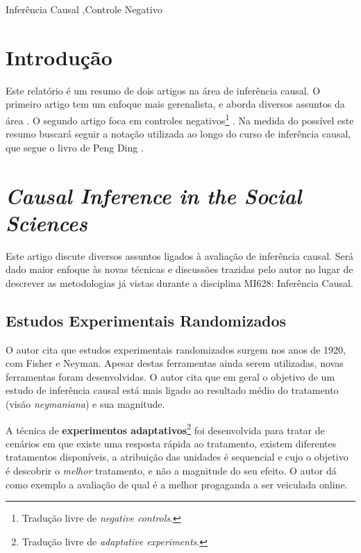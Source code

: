 \documentclass[final,5p]{elsarticle}
\numberwithin{equation}{section}
\begin{document}
\begin{frontmatter}
\begin{keyword}
    Inferência Causal \sep Controle Negativo



\end{keyword}

\end{frontmatter}

\section{Introdução}

    Este relatório é um resumo de dois artigos na área de inferência causal. O primeiro artigo tem um enfoque mais gerenalista, e aborda diversos assuntos da área \cite{imbens2024causal}. O segundo artigo foca em controles negativos\footnote{Tradução livre de \emph{negative controls}.} \cite{lipsitch2010negative}. Na medida do possível este resumo buscará seguir a notação utilizada ao longo do curso de inferência causal, que segue o livro de Peng Ding \cite{ding2023first}.

\section{\textit{Causal Inference in the Social Sciences}}

    Este artigo discute diversos assuntos ligados à avaliação de inferência causal. Será dado maior enfoque às novas técnicas e discussões trazidas pelo autor no lugar de descrever as metodologias já vistas durante a disciplina MI628: Inferência Causal.

    \subsection{Estudos Experimentais Randomizados}

    O autor cita que estudos experimentais randomizados surgem nos anos de 1920, com Fisher e Neyman. Apesar destas ferramentas ainda serem utilizadas, novas ferramentas foram desenvolvidas. O autor cita que em geral o objetivo de um estudo de inferência causal está mais ligado ao resultado médio do tratamento (visão \textit{neymaniana}) e sua magnitude.

    A técnica de \textbf{experimentos adaptativos}\footnote{Tradução livre de \textit{adaptative experiments}.} foi desenvolvida para tratar de cenários em que existe uma resposta rápida ao tratamento, existem diferentes tratamentos disponíveis, a atribuição das unidades é sequencial e cujo o objetivo é descobrir o \textit{melhor} tratamento, e não a magnitude do seu efeito. O autor dá como exemplo a avaliação de qual é a melhor progaganda a ser veiculada online.
\end{document}
